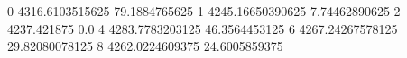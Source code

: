 0 4316.6103515625 79.1884765625
1 4245.16650390625 7.74462890625
2 4237.421875 0.0
4 4283.7783203125 46.3564453125
6 4267.24267578125 29.82080078125
8 4262.0224609375 24.6005859375
